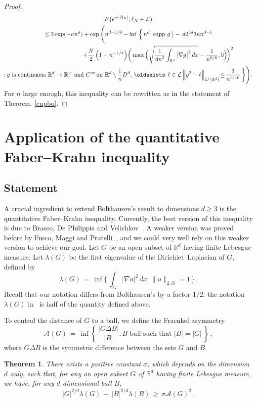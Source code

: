 \documentclass[10pt]{amsart}
\newtheorem{theo}{Theorem}[section]
\theoremstyle{definition}\newtheorem{defi}[theo]{Definition}\newtheorem{rema}[theo]{Remark}\newtheorem{exam}[theo]{Example}\newtheorem{exem}[theo]{Example}\newtheorem{nota}[theo]{Notation}
\newcommand*\supp{\text{supp\,}}
\newcommand*\Rd {{\mathbb R^d}}
\newcommand*\R{\mathbb{R}}
\newcommand{\cA}{\mathcal{A}}
\newcommand{\cL}{\mathcal{L}}
\renewcommand*{\exists}{\mathrel{\oldexists}}
\begin{document}
\begin{proof}
\begin{multline*}
E\big(e^{-|R_N|};
\ell_N\in\cL\big)\\
\leq 3\exp(-\kappa n^d)+\exp\Bigg(n^{d-1/8}
-\inf\,\Big\{\, n^d
\big|\,\supp\,g\,\big|
\,-\, {d2^{5d}} {3\kappa}{n^{d-1}}
\\
\mkern180mu+ \frac{N} {2} \left(1-n^{-1/4}\right)\!
\bigg(\max\Big(
\sqrt{\frac{1}{dn^2}\int_{\Rd}\big|\nabla g\big|^2\,dx }-
\frac{1}{n^{9/8}},0\Big)\!\bigg)^2
\\\!:g\text{ is continuous } \Rd\to\R^+
\text{ and }C^\infty\!\text{ on }\Rd\setminus \frac{1}{n}D^d,\,
\exists\,\ell\in\cL\,
\Big\|g^2- \ell\Big\|_{L^1(\Rd)}
\!\leq\!
\frac{3}{n^{1/16}}
\,\bigg\}\Bigg).
\end{multline*}
For $n$ large enough, this inequality can be rewritten as in the statement of Theorem~\ref{cupbo}.
\end{proof}

\section{Application of the quantitative Faber--Krahn inequality}\label{S:FK}

\subsection{Statement}
A crucial ingredient to extend Bolthausen's result to dimensions $d\geq 3$ is the quantitative Faber--Krahn inequality. Currently, the best version of this inequality is due to Brasco, De Philippis and Velichkov~\cite{BLGV}. A weaker version was proved before by Fusco, Maggi and Pratelli~\cite{FMP}, and we could very well rely on this weaker version to achieve our goal. Let $G$ be an open subset of $\Rd$ having finite Lebesgue measure. Let $\lambda(G)$ be the first eigenvalue of the Dirichlet--Laplacian of $G$, defined by
\[
\lambda(G)\,=\,\inf\Big\{\,\int_G\big|\nabla u\big|^2\,dx:\|u\|_{2,G}=1\,\Big\}\,.
\]
Recall that our notation differs from Bolthausen's by a factor $1/2$: the notation $\lambda(G)$ in~\cite{BO} is half of the quantity defined above.



 To control the distance of $G$ to a ball, we define the Fraenkel asymmetry
\[
\cA(G)\,=\,\inf\left\{\,\frac{|G\Delta B|}{|B|}:
B\text{ ball such that }|B|=|G|\,\right\}\,,
\]
where $G\Delta B$ is the symmetric difference between the sets $G$ and $B$.
\begin{theo}\label{fmp}
There exists a positive constant $\sigma$, which depends on the dimension $d$ only, such that, for any an open subset $G$ of $\Rd$ having finite Lebesgue measure, we have, for any $d$ dimensional ball $B$,
\[
|G|^{2/d}\lambda(G)\,-\,
|B|^{2/d}\lambda(B)\,\geq\,\sigma\cA(G)^2\,.
\]
\end{theo}
\end{document}
